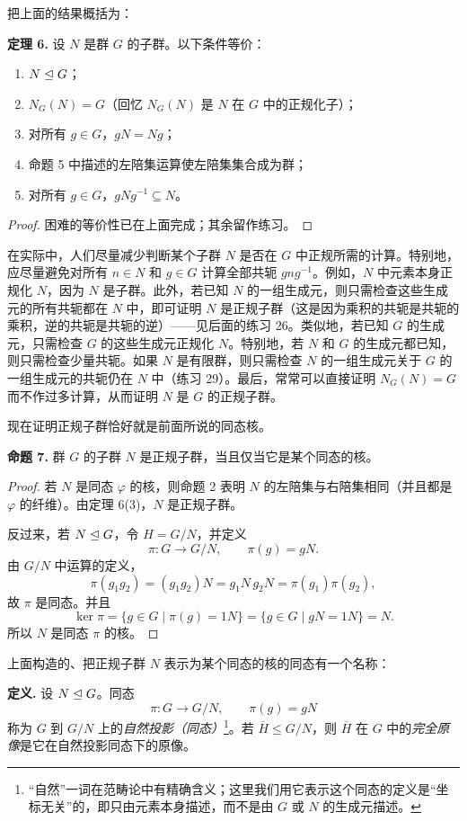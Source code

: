把上面的结果概括为：

\medskip
\noindent\textbf{定理 6.} 设 $N$ 是群 $G$ 的子群。以下条件等价：
\begin{enumerate}[label=(\arabic*)]
  \item $N\trianglelefteq G$；
  \item $N_G(N)=G$（回忆 $N_G(N)$ 是 $N$ 在 $G$ 中的正规化子）；
  \item 对所有 $g\in G$，$gN=Ng$；
  \item 命题 5 中描述的左陪集运算使左陪集集合成为群；
  \item 对所有 $g\in G$，$gNg^{-1}\subseteq N$。
\end{enumerate}

\begin{proof}
困难的等价性已在上面完成；其余留作练习。
\end{proof}

在实际中，人们尽量减少判断某个子群 $N$ 是否在 $G$ 中正规所需的计算。特别地，应尽量避免对所有 $n\in N$ 和 $g\in G$ 计算全部共轭 $gng^{-1}$。例如，$N$ 中元素本身正规化 $N$，因为 $N$ 是子群。此外，若已知 $N$ 的一组生成元，则只需检查这些生成元的所有共轭都在 $N$ 中，即可证明 $N$ 是正规子群（这是因为乘积的共轭是共轭的乘积，逆的共轭是共轭的逆）——见后面的练习 26。类似地，若已知 $G$ 的生成元，只需检查 $G$ 的这些生成元正规化 $N$。特别地，若 $N$ 和 $G$ 的生成元都已知，则只需检查少量共轭。如果 $N$ 是有限群，则只需检查 $N$ 的一组生成元关于 $G$ 的一组生成元的共轭仍在 $N$ 中（练习 29）。最后，常常可以直接证明 $N_G(N)=G$ 而不作过多计算，从而证明 $N$ 是 $G$ 的正规子群。

现在证明正规子群恰好就是前面所说的同态核。

\medskip
\noindent\textbf{命题 7.} 群 $G$ 的子群 $N$ 是正规子群，当且仅当它是某个同态的核。

\begin{proof}
若 $N$ 是同态 $\varphi$ 的核，则命题 2 表明 $N$ 的左陪集与右陪集相同（并且都是 $\varphi$ 的纤维）。由定理 6(3)，$N$ 是正规子群。

反过来，若 $N\trianglelefteq G$，令 $H=G/N$，并定义
\[
  \pi:G\to G/N,
  \qquad \pi(g)=gN.
\]
由 $G/N$ 中运算的定义，
\[
  \pi(g_1g_2)=(g_1g_2)N=g_1N\,g_2N=\pi(g_1)\pi(g_2),
\]
故 $\pi$ 是同态。并且
\[
  \ker\pi=\{g\in G\mid \pi(g)=1N\}
  =\{g\in G\mid gN=1N\}=N.
\]
所以 $N$ 是同态 $\pi$ 的核。
\end{proof}

上面构造的、把正规子群 $N$ 表示为某个同态的核的同态有一个名称：

\noindent\textbf{定义.} 设 $N\trianglelefteq G$。同态
\[
  \pi:G\to G/N,
  \qquad \pi(g)=gN
\]
称为 $G$ 到 $G/N$ 上的\emph{自然投影（同态）}\footnote{“自然”一词在范畴论中有精确含义；这里我们用它表示这个同态的定义是“坐标无关”的，即只由元素本身描述，而不是由 $G$ 或 $N$ 的生成元描述。}。若 $\overline H\leq G/N$，则 $\overline H$ 在 $G$ 中的\emph{完全原像}是它在自然投影同态下的原像。

